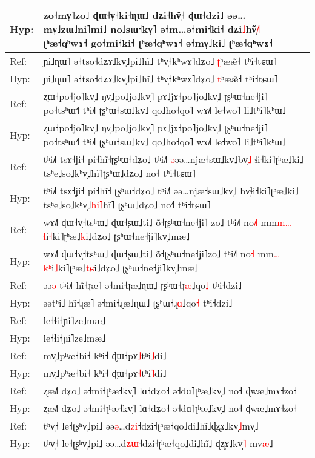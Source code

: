 \documentclass[10pt]{article}
\DeclareRobustCommand{\hl}[1]{{\textcolor{red}{#1}}}
\begin{document}
\begin{longtable}{ll}
Hyp: & zo˧mv̩˥zo˩ ɖɯ˧v̩˧ki˧ɳɯ˩ dʑi˧hṽ̩˧\hl{ }ɖɯ˧dzi˩ əə…mv̩˩zɯ˩ni˥mi˩ no˩sɯ˧kv̩˥ ə˧m…ə˧mi˧ki˧ dʑi\hl{˩}hṽ̩\hl{˩}˥ ʈʰæ˧qʰwɤ˧ go˧mi˧ki˧ ʈʰæ˧qʰwɤ˧ ə˧mv̩˩ki˩ ʈʰæ˧qʰwɤ˧ \\ 
\midrule 
Ref: & ɲi˩ɳɯ˥ ə˧tso˧dʑɤ˩kv̩˩pi˩hĩ˩ tʰv̩˧kʰwɤ˥dʑo˩ \hl{ʈ}ʰææ̃˧ tʰi˧tɕɯ˥ \\ 
Hyp: & ɲi˩ɳɯ˥ ə˧tso˧dʑɤ˩kv̩˩pi˩hĩ˩ tʰv̩˧kʰwɤ˥dʑo˩ \hl{t}ʰææ̃˧ tʰi˧tɕɯ˥ \\ 
\midrule 
Ref: & ʐɯ˧po˧jo˥kv̩˩ ŋv̩˩po˩jo˩kv̩˥ pɤ˩jɤ˧po˥jo˩kv̩˩ ʈʂʰɯ˧ne˧ʝi˥ po˧tsʰɯ˧˥ tʰi˩˥ ʈʂʰɯ˧sɯ˩kv̩˩ qo˩ho˧qo˥ wɤ˩˥ le˧wo˥ li˩tʰi˥kʰɯ˩ \\ 
Hyp: & ʐɯ˧po˧jo˥kv̩˩ ŋv̩˩po˩jo˩kv̩˥ pɤ˩jɤ˧po˥jo˩kv̩˩ ʈʂʰɯ˧ne˧ʝi˥ po˧tsʰɯ˧˥ tʰi˩˥ ʈʂʰɯ˧sɯ˩kv̩˩ qo˩ho˧qo˥ wɤ˩˥ le˧wo˥ li˩tʰi˥kʰɯ˩ \\ 
\midrule 
Ref: & tʰi˩˥ tsɤ˧ʝi˧ pi˧hĩ˧ʈʂʰɯ˧dʑo˩ tʰi˩˥ \hl{ə}əə…njæ˧sɯ˩kv̩˩bv̩\hl{˩}\hl{ }ɬi˧ki˥ʈʰæ˩ki˩ tsʰe˩so˩kʰv̩˩hĩ˥ʈʂʰɯ˩dʑo˩ no˧ tʰi˧tɕɯ˥ \\ 
Hyp: & tʰi˩˥ tsɤ˧ʝi˧ pi˧hĩ˧\hl{ }ʈʂʰɯ˧dʑo˩ tʰi˩˥ əə…njæ˧sɯ˩kv̩˩\hl{ }bv̩ɬi˧ki˥ʈʰæ˩ki˩ tsʰe˩so˩kʰv̩˩\hl{h}\hl{i}\hl{˥}hĩ˥\hl{ }ʈʂʰɯ˩dʑo˩ no˧\hl{˥} tʰi˧tɕɯ˥ \\ 
\midrule 
Ref: & wɤ˩˥ ɖɯ˧v̩˧tsʰɯ˩ ɖɯ˧ʂɯ˩ti˩ õ˧ʈʂʰɯ˧ne˧ʝi˥\hl{ }zo˩ tʰi˩˥ no\hl{˩}\hl{˥} mm\hl{m}\hl{…}\hl{ɬ}i\hl{˧}ki˥ʈʰæ˩\hl{k}i˩dʑo˩ ʈʂʰɯ˧ne˧ʝi˥kv̩˩mæ˩ \\ 
Hyp: & wɤ˩˥ ɖɯ˧v̩˧tsʰɯ˩ ɖɯ˧ʂɯ˩ti˩ õ˧ʈʂʰɯ˧ne˧ʝi˥zo˩ tʰi˩˥ no\hl{˧} mm\hl{…}\hl{k}\hl{ʰ}i\hl{˩}ki˥ʈʰæ˩\hl{t}\hl{ɕ}i˩dʑo˩ ʈʂʰɯ˧ne˧ʝi˥kv̩˩mæ˩ \\ 
\midrule 
Ref: & əə\hl{ə}\hl{ }tʰi˩\hl{˥} hĩ˧ɻæ˥ ə˧mi˧ɻæ˩ɳɯ˩ ʈʂʰɯ˧ɻ\hl{æ}˩qo\hl{˩} tʰi˧dzi˩ \\ 
Hyp: & əətʰi˩ hĩ˧ɻæ˥ ə˧mi˧ɻæ˩ɳɯ˩ ʈʂʰɯ˧ɻ\hl{ɑ}˩qo\hl{˧} tʰi˧dzi˩ \\ 
\midrule 
Ref: & le˧ɬi˧ɲi˥ze˩mæ˩ \\ 
Hyp: & le˧ɬi˧ɲi˥ze˩mæ˩ \\ 
\midrule 
Ref: & mv̩˩pʰæ˧bi˧ kʰi˧ ɖɯ˧pɤ\hl{˩}tʰi\hl{˩}di˩ \\ 
Hyp: & mv̩˩pʰæ˧bi˧ kʰi˧ ɖɯ˧pɤ\hl{˧}tʰi\hl{˥}di˩ \\ 
\midrule 
Ref: & ʐæ˩˥ dʑo˩ ə˧mi˧ʈʰæ˧kv̩˥ lɑ˧dʑo˧ ə˧dɑ˥ʈʰæ˩kv̩˩ no˧ ɖwæ˩mɤ˧zo˧ \\ 
Hyp: & ʐæ˩˥ dʑo˩ ə˧mi˧ʈʰæ˧kv̩˥ lɑ˧dʑo˧ ə˧dɑ˥ʈʰæ˩kv̩˩ no˧ ɖwæ˩mɤ˧zo˧ \\ 
\midrule 
Ref: & tʰv̩˧ le˧ʈʂʰv̩˩pi˩ əə\hl{ə}…d\hl{z}\hl{i}˧dzi˧ʈʰæ˧qo˩di˩hĩ˩ɖʐɤ˩kv̩\hl{˩}mv\hl{̩}˩ \\ 
Hyp: & tʰv̩˧ le˧ʈʂʰv̩˩pi˩ əə…d\hl{ʑ}\hl{ɯ}˧dzi˧ʈʰæ˧qo˩di˩hĩ˩\hl{ }ɖʐɤ˩kv̩\hl{˥}\hl{ }mv\hl{æ}˩ \\ 

\end{longtable}
\end{document}
